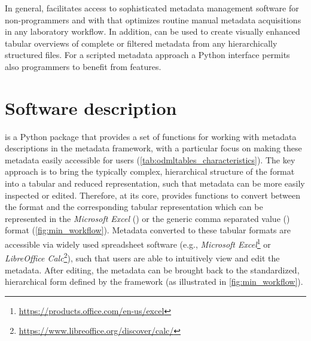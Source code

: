 In general,  facilitates access to sophisticated metadata management software  for non-programmers and with that optimizes routine manual metadata acquisitions in any laboratory workflow. In addition,  can be used to create visually enhanced tabular overviews of complete or filtered metadata from any hierarchically structured  files. For a scripted metadata approach a Python interface permits also programmers to benefit from  features.


\section{Software description}
\label{sec:Software}

 is a Python package that provides a set of functions for working with metadata descriptions in the  metadata framework, with a particular focus on making these metadata easily accessible for users (\cref{tab:odmltables_characteristics}). The key approach is to bring the typically complex, hierarchical structure of the  format into a tabular and reduced  representation, such that metadata can be more easily inspected or edited. Therefore, at its core,  provides functions to convert between the  format and the corresponding tabular representation which can be represented in the \textit{Microsoft Excel} () or the generic comma separated value () format (\cref{fig:min_workflow}). Metadata converted to these tabular formats are accessible via widely used spreadsheet software (e.g., \textit{Microsoft Excel}\footnote{\url{https://products.office.com/en-us/excel}} or \textit{LibreOffice Calc}\footnote{\url{https://www.libreoffice.org/discover/calc/}}), such that users are able to intuitively view and edit the metadata. After editing, the metadata can be brought back to the standardized, hierarchical form defined by the  framework (as illustrated in \cref{fig:min_workflow}).

